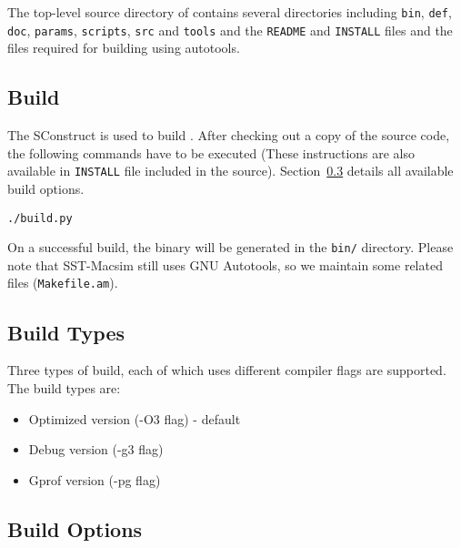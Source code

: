 \ignore
	  {
		The top-level source directory of \SIM contains several directories including
		\Verb+bin+, \Verb+def+, \Verb+doc+, \Verb+params+, \Verb+scripts+, \Verb+src+ and
		\Verb+tools+ and the \Verb+README+ and \Verb+INSTALL+ files and the files
		required for building \SIM using autotools.
	  }


\subsection{Build}

The SConstruct is used to build \SIM. After checking out a copy of the
\SIM source code, the following commands have to be executed (These
instructions are also available in \Verb+INSTALL+ file included in the
\SIM source). Section~\ref{sec:buildoption} details all available build options.


\begin{Verbatim}
./build.py
\end{Verbatim}

\noindent
On a successful build, the binary \bin will be generated in the
\Verb+bin/+ directory. Please note that SST-Macsim still uses
GNU Autotools, so we maintain some related files (\Verb+Makefile.am+).


\subsection{Build Types}

Three types of build, each of which uses different compiler flags are
supported. The build types are:

\begin{itemize}
  \item Optimized version (-O3 flag) - default
  \item Debug version (-g3 flag)
  \item Gprof version (-pg flag)
\end{itemize}


\subsection{Build Options}
\label{sec:buildoption}


